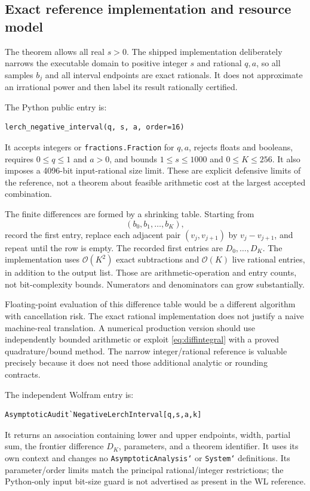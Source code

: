 \documentclass[11pt,a4paper]{article}
\newcommand{\OO}{\mathcal O}
\begin{document}
\subsection{Exact reference implementation and resource model}
The theorem allows all real $s>0$. The shipped implementation deliberately narrows the executable domain to positive integer $s$ and rational $q,a$, so all samples $b_j$ and all interval endpoints are exact rationals. It does not approximate an irrational power and then label its result rationally certified.

The Python public entry is:
\begin{lstlisting}
lerch_negative_interval(q, s, a, order=16)
\end{lstlisting}
It accepts integers or \texttt{fractions.Fraction} for $q,a$, rejects floats and booleans, requires $0\le q\le1$ and $a>0$, and bounds $1\le s\le1000$ and $0\le K\le256$. It also imposes a 4096-bit input-rational size limit. These are explicit defensive limits of the reference, not a theorem about feasible arithmetic cost at the largest accepted combination.

The finite differences are formed by a shrinking table. Starting from
\[
 (b_0,b_1,\ldots,b_K),
\]
record the first entry, replace each adjacent pair $(v_j,v_{j+1})$ by $v_j-v_{j+1}$, and repeat until the row is empty. The recorded first entries are $D_0,\ldots,D_K$. The implementation uses $\OO(K^2)$ exact subtractions and $\OO(K)$ live rational entries, in addition to the output list. Those are arithmetic-operation and entry counts, not bit-complexity bounds. Numerators and denominators can grow substantially.

Floating-point evaluation of this difference table would be a different algorithm with cancellation risk. The exact rational implementation does not justify a naive machine-real translation. A numerical production version should use independently bounded arithmetic or exploit \eqref{eq:diffintegral} with a proved quadrature/bound method. The narrow integer/rational reference is valuable precisely because it does not need those additional analytic or rounding contracts.

The independent Wolfram entry is:
\begin{lstlisting}
AsymptoticAudit`NegativeLerchInterval[q,s,a,k]
\end{lstlisting}
It returns an association containing lower and upper endpoints, width, partial sum, the frontier difference $D_K$, parameters, and a theorem identifier. It uses its own context and changes no \texttt{AsymptoticAnalysis`} or \texttt{System`} definitions. Its parameter/order limits match the principal rational/integer restrictions; the Python-only input bit-size guard is not advertised as present in the WL reference.
\end{document}
